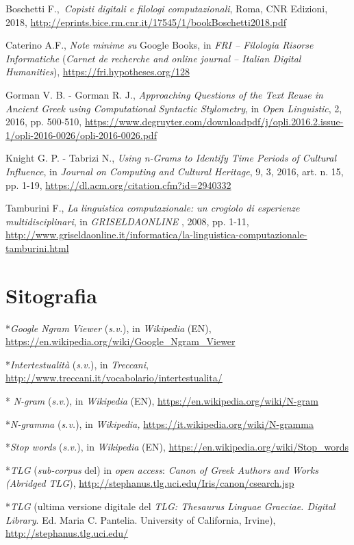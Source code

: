 {{Boschetti F.,~\emph{Copisti digitali e filologi computazionali}, Roma,
CNR Edizioni, 2018,
\url{http://eprints.bice.rm.cnr.it/17545/1/bookBoschetti2018.pdf} 

Caterino A.F., \emph{Note minime su} Google Books, in \emph{FRI --
Filologia Risorse Informatiche} (\emph{Carnet de recherche and online
journal -- Italian Digital Humanities}),
\url{https://fri.hypotheses.org/128}

Gorman V. B. - Gorman R. J., \emph{Approaching Questions of the Text
Reuse in Ancient Greek using Computational Syntactic Stylometry}, in
\emph{Open Linguistic}, 2, 2016, pp. 500-510,
\url{https://www.degruyter.com/downloadpdf/j/opli.2016.2.issue-1/opli-2016-0026/opli-2016-0026.pdf}

Knight G. P. - Tabrizi N., \emph{Using n-Grams to Identify Time Periods
of Cultural Influence}, in \emph{Journal on Computing and Cultural
Heritage}, 9, 3, 2016, art. n. 15, pp. 1-19,
\url{https://dl.acm.org/citation.cfm?id=2940332}

Tamburini F., \emph{La linguistica computazionale: un crogiolo di
esperienze multidisciplinari}, in \emph{GRISELDAONLINE} , 2008, pp.
1-11,
\url{http://www.griseldaonline.it/informatica/la-linguistica-computazionale-tamburini.html}
}

\section*{Sitografia}
{\parindent0pt 
*\emph{Google Ngram Viewer} (\emph{s.v.}), in \emph{Wikipedia} (EN),
\url{https://en.wikipedia.org/wiki/Google_Ngram_Viewer}

*\emph{Intertestualità} (\emph{s.v.}), in \emph{Treccani},
\url{http://www.treccani.it/vocabolario/intertestualita/}

* \emph{N-gram} (\emph{s.v}.), in \emph{Wikipedia} (EN),
\url{https://en.wikipedia.org/wiki/N-gram}

*\emph{N-gramma} (\emph{s.v.}), in \emph{Wikipedia,}
\url{https://it.wikipedia.org/wiki/N-gramma}

*\emph{Stop words} (\emph{s.v.}), in \emph{Wikipedia} (EN),
\url{https://en.wikipedia.org/wiki/Stop_words}

*\emph{TLG} (\emph{sub-corpus} del) in \emph{open access}: \emph{Canon
of Greek Authors and Works (Abridged TLG}),
\url{http://stephanus.tlg.uci.edu/Iris/canon/csearch.jsp}

*\emph{TLG} (ultima versione digitale del \emph{TLG: Thesaurus Linguae
Graeciae. Digital Library}. Ed. Maria C. Pantelia. University of
California, Irvine),
\url{http://stephanus.tlg.uci.edu/}

}}
